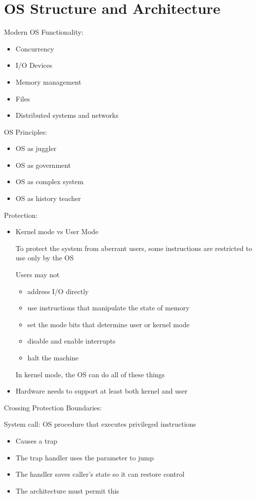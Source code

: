 \documentclass[12pt]{article}
\begin{document}
\section{OS Structure and Architecture}

Modern OS Functionality:
\begin{itemize}
    \item Concurrency
    \item I/O Devices
    \item Memory management
    \item Files
    \item Distributed systems and networks
\end{itemize}

OS Principles:
\begin{itemize}
    \item OS as juggler
    \item OS as government
    \item OS as complex system
    \item OS as history teacher
\end{itemize}

Protection:
\begin{itemize}
    \item Kernel mode vs User Mode
    
    To protect the system from aberrant users, some instructions are restricted to use only by the OS

    Users may not
    \begin{itemize}
        \item address I/O directly
        \item use instructions that manipulate the state of memory
        \item set the mode bits that determine user or kernel mode
        \item disable and enable interrupts
        \item halt the machine
    \end{itemize}

    In kernel mode, the OS can do all of these things

    \item Hardware needs to support at least both kernel and user
\end{itemize}

Crossing Protection Boundaries:

System call: OS procedure that executes privileged instructions
\begin{itemize}
    \item Causes a trap
    \item The trap handler uses the parameter to jump
    \item The handler saves caller's state so it can restore control
    \item The architecture must permit this
\end{itemize}
\end{document}
